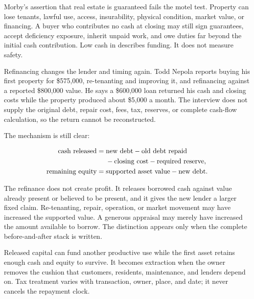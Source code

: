 Morby's assertion that real estate is guaranteed fails the motel test. Property
can lose tenants, lawful use, access, insurability, physical condition, market
value, or financing. A buyer who contributes no cash at closing may still sign
guarantees, accept deficiency exposure, inherit unpaid work, and owe duties far
beyond the initial cash contribution. Low cash in describes funding. It does
not measure safety.

Refinancing changes the lender and timing again. Todd Nepola reports buying his
first property for \$575,000, re-tenanting and improving it, and refinancing
against a reported \$800,000 value. He says a \$600,000 loan returned his cash
and closing costs while the property produced about \$5,000 a month. The
interview does not supply the original debt, repair cost, fees, tax, reserves,
or complete cash-flow calculation, so the return cannot be reconstructed.

The mechanism is still clear:

\begin{equation}
\ifdim\paperwidth<450pt
\begin{aligned}
\text{cash released}={}&\text{new debt}\\
 &-\text{old debt repaid}-\text{closing cost}\\
 &-\text{required reserve},\\
&\text{remaining equity}\\
&\quad=\text{supported asset value}\\
&\qquad-\text{new debt}.
\end{aligned}
\else
\begin{aligned}
\text{cash released}={}&\text{new debt}-\text{old debt repaid}\\
 &-\text{closing cost}-\text{required reserve},\\
\text{remaining equity}={}&\text{supported asset value}-\text{new debt}.
\end{aligned}
\fi
\end{equation}

The refinance does not create profit. It releases borrowed cash against value
already present or believed to be present, and it gives the new lender a larger
fixed claim. Re-tenanting, repair, operation, or market movement may have
increased the supported value. A generous appraisal may merely have increased
the amount available to borrow. The distinction appears only when the complete
before-and-after stack is written.

Released capital can fund another productive use while the first asset retains
enough cash and equity to survive. It becomes extraction when the owner removes
the cushion that customers, residents, maintenance, and lenders depend on. Tax
treatment varies with transaction, owner, place, and date; it never cancels the
repayment clock.


